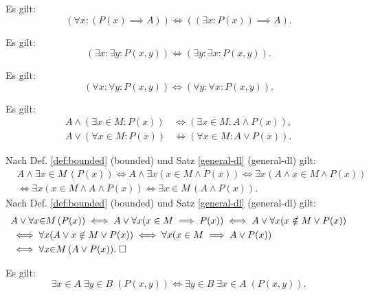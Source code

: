 \begin{Satz}\label{exists-implies-const}
Es gilt:
\[(\forall x\colon (P(x)\implies A)) \iff ((\exists x\colon P(x))\implies A).\]
\end{Satz}

\begin{Satz}\label{exists-cl}
Es gilt:
\[(\exists x\colon\exists y\colon P(x,y)) \iff (\exists y\colon\exists x\colon P(x,y)).\]
\end{Satz}

\begin{Satz}\label{all-cl}
Es gilt:
\[(\forall x\colon\forall y\colon P(x,y)) \iff (\forall y\colon\forall x\colon P(x,y)).\]
\end{Satz}

\begin{Satz}%
\label{bounded-general-dl}
Es gilt:
\begin{align}
A\land (\exists x{\in}M\colon P(x)) &\iff (\exists x{\in}M\colon A\land P(x)),\\
A\lor (\forall x{\in}M\colon P(x)) &\iff (\forall x{\in}M\colon A\lor P(x)).
\end{align}
\end{Satz}

\begin{Beweis}
Nach Def. \ref{def:bounded} (bounded)
und Satz \ref{general-dl} (general-dl) gilt:
\begin{align*}
&A\land \exists x{\in}M\,(P(x))
\iff A\land\exists x(x\in M\land P(x))
\iff \exists x(A\land x\in M\land P(x))\\
&\iff \exists x(x\in M\land A\land P(x))
\iff \exists x{\in}M\,(A\land P(x)).
\end{align*}
Nach Def. \ref{def:bounded} (bounded)
und Satz \ref{general-dl} (general-dl) gilt:
\begin{align*}
& A\lor\forall x{\in}M\,(P(x))
\iff A\lor\forall x(x\in M\implies P(x))
\iff A\lor\forall x(x\notin M\lor P(x))\\
&\iff \forall x(A\lor x\notin M\lor P(x))
\iff \forall x(x\in M\implies A\lor P(x))\\
&\iff \forall x{\in}M\,(A\lor P(x)).\;\square
\end{align*}
\end{Beweis}

\begin{Satz}\label{bounded-exists-cl}
Es gilt:
\[\exists x{\in}A\;\exists y{\in}B\;(P(x,y))
\iff \exists y{\in}B\;\exists x{\in}A\;(P(x,y)).\]
\end{Satz}

